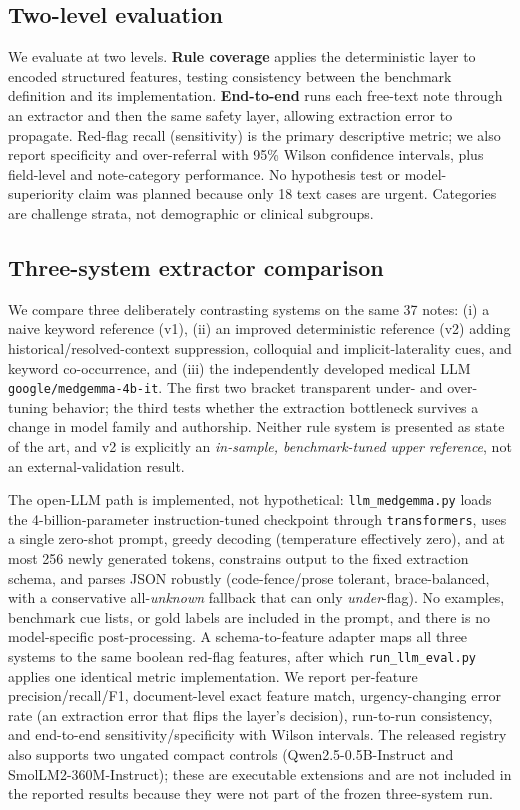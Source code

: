 \documentclass[11pt]{article}
\begin{document}
\subsection{Two-level evaluation}
We evaluate at two levels. \textbf{Rule coverage} applies the deterministic layer to encoded structured features, testing consistency between the benchmark definition and its implementation. \textbf{End-to-end} runs each free-text note through an extractor and then the same safety layer, allowing extraction error to propagate. Red-flag recall (sensitivity) is the primary descriptive metric; we also report specificity and over-referral with 95\% Wilson confidence intervals, plus field-level and note-category performance. No hypothesis test or model-superiority claim was planned because only 18 text cases are urgent. Categories are challenge strata, not demographic or clinical subgroups.

\subsection{Three-system extractor comparison}
We compare three deliberately contrasting systems on the same 37 notes: (i) a naive keyword reference (v1), (ii) an improved deterministic reference (v2) adding historical/resolved-context suppression, colloquial and implicit-laterality cues, and keyword co-occurrence, and (iii) the independently developed medical LLM \texttt{google/medgemma-4b-it}. The first two bracket transparent under- and over-tuning behavior; the third tests whether the extraction bottleneck survives a change in model family and authorship. Neither rule system is presented as state of the art, and v2 is explicitly an \emph{in-sample, benchmark-tuned upper reference}, not an external-validation result.

The open-LLM path is implemented, not hypothetical: \texttt{llm\_medgemma.py} loads the 4-billion-parameter instruction-tuned checkpoint through \texttt{transformers}, uses a single zero-shot prompt, greedy decoding (temperature effectively zero), and at most 256 newly generated tokens, constrains output to the fixed extraction schema, and parses JSON robustly (code-fence/prose tolerant, brace-balanced, with a conservative all-\emph{unknown} fallback that can only \emph{under}-flag). No examples, benchmark cue lists, or gold labels are included in the prompt, and there is no model-specific post-processing. A schema-to-feature adapter maps all three systems to the same boolean red-flag features, after which \texttt{run\_llm\_eval.py} applies one identical metric implementation. We report per-feature precision/recall/F1, document-level exact feature match, urgency-changing error rate (an extraction error that flips the layer's decision), run-to-run consistency, and end-to-end sensitivity/specificity with Wilson intervals. The released registry also supports two ungated compact controls (Qwen2.5-0.5B-Instruct and SmolLM2-360M-Instruct); these are executable extensions and are not included in the reported results because they were not part of the frozen three-system run.
\end{document}
